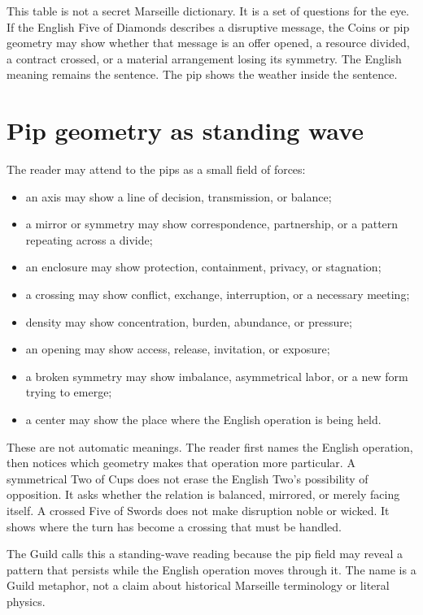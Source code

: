 This table is not a secret Marseille dictionary. It is a set of questions for
the eye. If the English Five of Diamonds describes a disruptive message, the
Coins or pip geometry may show whether that message is an offer opened, a
resource divided, a contract crossed, or a material arrangement losing its
symmetry. The English meaning remains the sentence. The pip shows the weather
inside the sentence.

\section{Pip geometry as standing wave}

The reader may attend to the pips as a small field of forces:

\begin{itemize}
\item an axis may show a line of decision, transmission, or balance;
\item a mirror or symmetry may show correspondence, partnership, or a pattern
      repeating across a divide;
\item an enclosure may show protection, containment, privacy, or stagnation;
\item a crossing may show conflict, exchange, interruption, or a necessary
      meeting;
\item density may show concentration, burden, abundance, or pressure;
\item an opening may show access, release, invitation, or exposure;
\item a broken symmetry may show imbalance, asymmetrical labor, or a new form
      trying to emerge;
\item a center may show the place where the English operation is being held.
\end{itemize}

These are not automatic meanings. The reader first names the English operation,
then notices which geometry makes that operation more particular. A symmetrical
Two of Cups does not erase the English Two's possibility of opposition. It asks
whether the relation is balanced, mirrored, or merely facing itself. A crossed
Five of Swords does not make disruption noble or wicked. It shows where the
turn has become a crossing that must be handled.

The Guild calls this a standing-wave reading because the pip field may reveal a
pattern that persists while the English operation moves through it. The name is
a Guild metaphor, not a claim about historical Marseille terminology or literal
physics.

